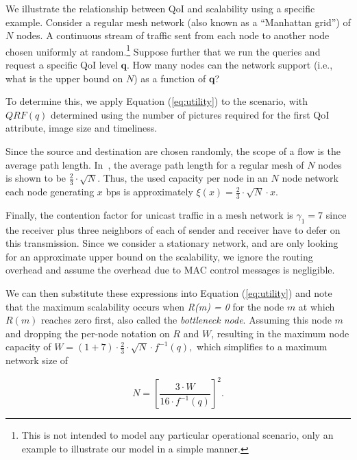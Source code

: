 We illustrate the relationship between QoI and scalability using a
 specific example.  Consider a
regular mesh network (also known as a ``Manhattan grid'') of $N$ nodes.
A continuous stream of traffic sent from each node to another node chosen
uniformly at random.\footnote{This is not
intended to model any particular operational scenario, only an
example to illustrate our model in a simple manner.}  Suppose
further that we run the queries and request a specific  QoI level $\mathbf{q}$.  How
many nodes can the network support (i.e., what is the upper bound on
$N$) as a function of $\mathbf{q}$?

To determine this, we apply Equation (\ref{eq:utility}) to the scenario, with
$QRF(q)$  determined using the number of pictures required for the first QoI attribute, image size and timeliness.

Since the source and destination are chosen randomly, the scope of a flow is
the average path length. In~\cite{Silv83}, the average path length for a
regular mesh of $N$ nodes is shown to be
$\frac{2}{3}\cdot \sqrt{N}$. Thus, the used capacity per node
in an $N$ node network each node generating $x$ bps
is approximately $\xi(x) = \frac{2}{3}\cdot \sqrt{N}\cdot
x$.

Finally, the contention factor for unicast traffic in a mesh network
is $\gamma_1 = 7$ since the receiver
plus three neighbors of each of sender and receiver
 have to defer on this transmission. Since we
consider a stationary network, and are only looking for an approximate
upper bound on the scalability, we ignore the routing overhead and
assume the overhead due to MAC control messages is negligible.



We can then substitute these expressions  into Equation (\ref{eq:utility}) and note that the maximum
scalability occurs when \emph{R(m) = 0} for the node $m$ at which $R(m)$ reaches zero first, also called the \emph{bottleneck node}.  Assuming this node $m$ and dropping the per-node notation on $R$ and $W$, resulting in the maximum node capacity of
$
W = (1+7)\cdot \frac{2}{3}\cdot  \sqrt{N}\cdot  f^{-1}(q),  %
$
which simplifies to a maximum network size of

\begin{equation}
N = [\frac{3\cdot W}{16\cdot f^{-1}(q)}]^2.
\end{equation}

